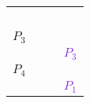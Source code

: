 \documentclass[10pt]{beamer}
\begin{document}
\begin{frame}
\begin{tabularx}{0.6\textwidth}{XccY}
                                                                                                                                                                                    &  &                                                     & \textcolor{BlueViolet}{ \parbox{0.5cm}{ \ }}                                                                                                               \\
        \textcolor{Sepia}{\parbox{0.5cm}{$P_3$} }                                                                                                             &                                                       &                                                     &                                                                                                                                                                                  \\
                                                                                                                                                                                    &                                                       &                                                     & \textcolor{BlueViolet}{ \parbox{0.5cm}{$P_3$}}                                                                                                             \\
        \textcolor{Sepia}{\parbox{0.5cm}{$P_4$} }                                                                                                             &                                                       &                                     &                                                                                                                                                                                  \\
                                                                                                                                                                                    &  &                                                     & \textcolor{BlueViolet}{ \parbox{0.5cm}{$P_1$}}                                                                                                             \\

\end{tabularx}
\end{frame}
\end{document}

